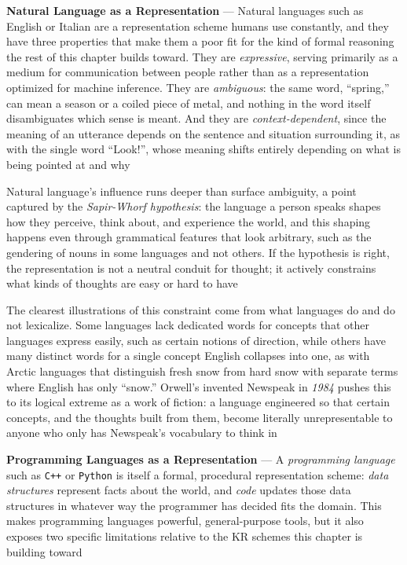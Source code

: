 \textbf{Natural Language as a Representation} --- Natural languages such as
English or Italian are a representation scheme humans use constantly, and
they have three properties that make them a poor fit for the kind of formal
reasoning the rest of this chapter builds toward. They are \emph{expressive},
serving primarily as a medium for communication between people rather than
as a representation optimized for machine inference. They are
\emph{ambiguous}: the same word, ``spring,'' can mean a season or a coiled
piece of metal, and nothing in the word itself disambiguates which sense is
meant. And they are \emph{context-dependent}, since the meaning of an
utterance depends on the sentence and situation surrounding it, as with the
single word ``Look!'', whose meaning shifts entirely depending on what is
being pointed at and why

Natural language's influence runs deeper than surface ambiguity, a point
captured by the \emph{Sapir-Whorf hypothesis}: the language a person speaks
shapes how they perceive, think about, and experience the world, and this
shaping happens even through grammatical features that look arbitrary, such
as the gendering of nouns in some languages and not others. If the
hypothesis is right, the representation is not a neutral conduit for
thought; it actively constrains what kinds of thoughts are easy or hard to
have

The clearest illustrations of this constraint come from what languages do
and do not lexicalize. Some languages lack dedicated words for concepts
that other languages express easily, such as certain notions of direction,
while others have many distinct words for a single concept English
collapses into one, as with Arctic languages that distinguish fresh snow
from hard snow with separate terms where English has only ``snow.''
Orwell's invented Newspeak in \emph{1984} pushes this to its logical
extreme as a work of fiction: a language engineered so that certain
concepts, and the thoughts built from them, become literally
unrepresentable to anyone who only has Newspeak's vocabulary to think in

\textbf{Programming Languages as a Representation} --- A \emph{programming
language} such as \texttt{C++} or \texttt{Python} is itself a formal,
procedural representation scheme: \emph{data structures} represent facts
about the world, and \emph{code} updates those data structures in whatever
way the programmer has decided fits the domain. This makes programming
languages powerful, general-purpose tools, but it also exposes two specific
limitations relative to the KR schemes this chapter is building toward

